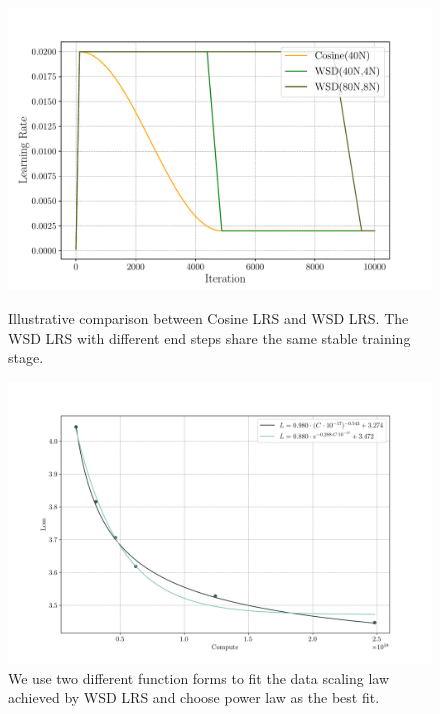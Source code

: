 \begin{figure}[!htbp]
    \centering
    \begin{minipage}{0.45\linewidth}
        \includegraphics[width=0.98\linewidth]{Fig/lr.pdf}
        \caption{Illustrative comparison between Cosine LRS and WSD LRS. The WSD LRS with different end steps share the same stable training stage. }\label{fig:learning_rate_scheduler_diagram}
    \end{minipage}
        \begin{minipage}{0.45\linewidth}
    \centering
    \includegraphics[width=1.05\linewidth]{Fig/fit_continuetrain.png}
    \caption{We use two different function forms to fit the data scaling law achieved by WSD LRS and choose power law as the best fit.}
    \label{fig:fit_continue_train}
    \end{minipage}
\end{figure}


